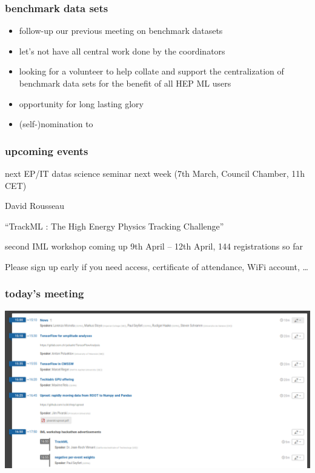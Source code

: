 \begin{frame}
  \frametitle{benchmark data sets}
  \begin{itemize}
    \item follow-up our previous meeting on benchmark datasets
    \item let's not have all central work done by the coordinators
    \item looking for a volunteer to help collate and support the centralization 
      of benchmark data sets for the benefit of all HEP ML users
    \item opportunity for long lasting glory
    \item (self-)nomination to 
  \end{itemize}
\end{frame}

\begin{frame}
  \frametitle{upcoming events}
  \begin{exampleblock}{next EP/IT datas science seminar}
    next week (7th March, Council Chamber, 11h CET)

    David Rousseau
    
    ``TrackML : The High Energy Physics Tracking Challenge''

\end{exampleblock}
  \begin{block}{second IML workshop coming up}
    9th April -- 12th April, 144 registrations so far

\end{block}
Please sign up early if you need access, certificate of attendance, WiFi account, \dots
\end{frame}

\begin{frame}
  \frametitle{today's meeting}
  \includegraphics[width=.95\textwidth]{./agenda.png}
\end{frame}

